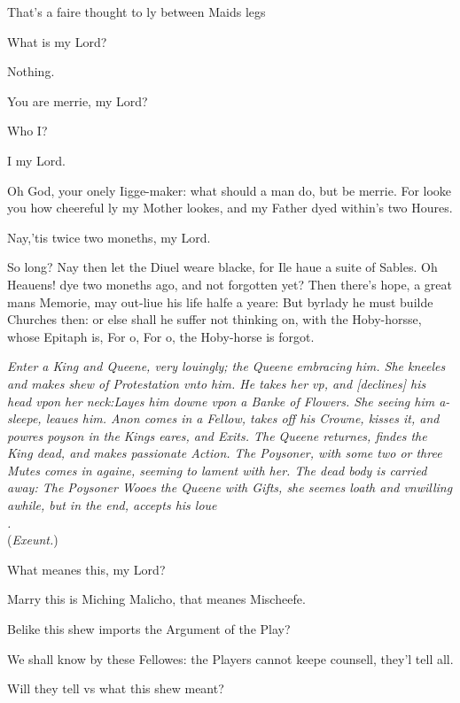 \documentclass[a5paper,DIV=calc,11pt]{scrbook}
\begin{document}
\begin{drama*}
    \hamspeaks That's a faire thought to ly between Maids legs
    
    \ophespeaks What is my Lord?
    
    \hamspeaks Nothing.
    
    \ophespeaks You are merrie, my Lord?
    
    \hamspeaks Who I?
    
    \ophespeaks I my Lord.
    
    \hamspeaks Oh God, your onely Iigge-maker: what should a man do, but be merrie. For looke you how cheereful ly my Mother lookes, and my Father dyed within's two Houres.
    
    \ophespeaks Nay,'tis twice two moneths, my Lord.
    
    \hamspeaks So long? Nay then let the Diuel weare blacke, for Ile haue a suite of Sables. Oh Heauens! dye two moneths ago, and not forgotten yet? Then there's hope, a great mans Memorie, may out-liue his life halfe a yeare: But byrlady he must builde Churches then: or else shall he suffer not thinking on, with the Hoby-horsse, whose Epitaph is, For o, For o, the Hoby-horse is forgot.
    
    \textit{Enter a King and Queene, very louingly; the Queene embracing him. She kneeles and makes shew of Protestation vnto him. He takes her vp, and [declines] his head vpon her neck:Layes him downe vpon a Banke of Flowers. She seeing him a-sleepe, leaues him. Anon comes in a Fellow, takes off his Crowne, kisses it, and powres poyson in the Kings eares, and Exits. The Queene returnes, findes the King dead, and makes passionate Action. The Poysoner, with some two or three Mutes comes in againe, seeming to lament with her. The dead body is carried away: The Poysoner Wooes the Queene with Gifts, she seemes loath and vnwilling awhile, but in the end, accepts his loue\\
    .}\\
    (\textit{Exeunt.})
    
    
    \ophespeaks What meanes this, my Lord?
    
    \hamspeaks Marry this is Miching Malicho, that meanes Mischeefe.
    
    \ophespeaks Belike this shew imports the Argument of the Play?
    
    \hamspeaks We shall know by these Fellowes: the Players cannot keepe counsell, they'l tell all.
    
    \ophespeaks Will they tell vs what this shew meant?
    

\end{drama*}
\end{document}
